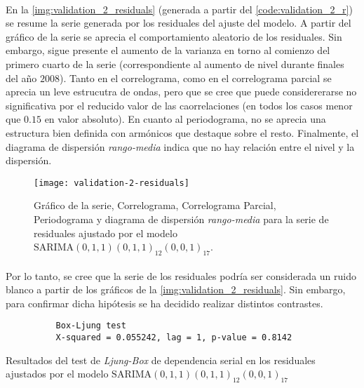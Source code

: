 \documentclass[a4paper, spanish]{article}
\begin{document}
      \paragraph{}
      En la \autoref{img:validation_2_residuals} (generada a partir del \autoref{code:validation_2_r}) se resume la serie generada por los residuales del ajuste del modelo. A partir del gráfico de la serie se aprecia el comportamiento aleatorio de los residuales. Sin embargo, sigue presente el aumento de la varianza en torno al comienzo del primero cuarto de la serie (correspondiente al aumento de nivel durante finales del año $2008$). Tanto en el correlograma, como en el correlograma parcial se aprecia un leve estrucutra de ondas, pero que se cree que puede considererarse no significativa por el reducido valor de las caorrelaciones (en todos los casos menor que $0.15$ en valor absoluto). En cuanto al periodograma, no se aprecia una estructura bien definida con armónicos que destaque sobre el resto. Finalmente, el diagrama de dispersión \emph{rango-media} indica que no hay relación entre el nivel y la dispersión.

      \begin{figure}[htb!]
        \centering
        \texttt{[image: validation-2-residuals]}
        \caption{Gráfico de la serie, Correlograma, Correlograma Parcial, Periodograma y diagrama de dispersión \emph{rango-media} para la serie de residuales ajustado por el modelo $\text{SARIMA}(0, 1, 1)(0, 1, 1)_{12}(0, 0, 1)_{17}$.}
        \label{img:validation_2_residuals}
      \end{figure}

      \paragraph{}
      Por lo tanto, se cree que la serie de los residuales podría ser considerada un ruido blanco a partir de los gráficos de la \autoref{img:validation_2_residuals}. Sin embargo, para confirmar dicha hipótesis se ha decidido realizar distintos contrastes.

      \begin{table}[htb!]
        \begin{Verbatim}
          Box-Ljung test
          X-squared = 0.055242, lag = 1, p-value = 0.8142
        \end{Verbatim}
        \caption{Resultados del test de \emph{Ljung-Box} de dependencia serial en los residuales ajustados por el modelo $\text{SARIMA}(0, 1, 1)(0, 1, 1)_{12}(0, 0, 1)_{17}$}
        \label{result:comparison_2_ljung_box_1}
      \end{table}
\end{document}
